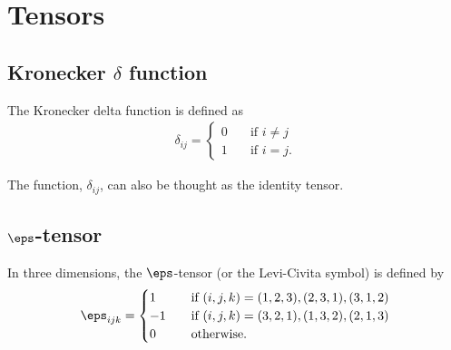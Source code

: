 \documentclass[12pt, a4paper]{article}
\begin{document}

\section{Tensors}

\subsection{Kronecker \texorpdfstring{\(\delta\)}{TEXT} function}

\begin{definition}
    The Kronecker delta function is defined as
    \[\begin{aligned}
        \delta_{ij} = \begin{cases}
            0 \quad &\text{if } i \neq j \\
            1 \quad &\text{if } i =j.
        \end{cases}
    \end{aligned}\]
\end{definition}

\begin{mdnote}
    The function, \(\delta_{ij}\), can also be thought as the identity tensor.
\end{mdnote}

\subsection{\texorpdfstring{\(\eps\)}{TEXT}-tensor}

\begin{definition}
    In three dimensions, the \(\eps\)-tensor (or the Levi-Civita symbol) is defined by 
    \[\begin{aligned}
        \eps_{ijk} =\begin{cases}
            1 \quad &\text{if } (i,j,k) = (1,2,3),(2,3,1),(3,1,2)\\
            -1 \quad &\text{if } (i,j,k) = (3,2,1),(1,3,2),(2,1,3)\\
            0 \quad &\text{otherwise.}
        \end{cases}
    \end{aligned}\]
\end{definition}
\end{document}
